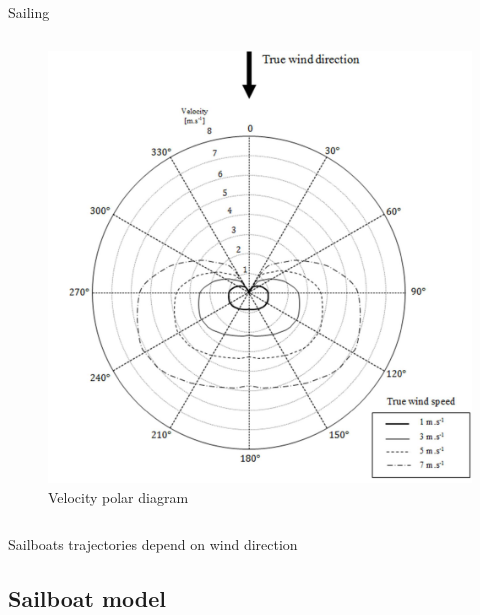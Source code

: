 \documentclass[10pt,xcolor={table,dvipsnames},t]{beamer}
\begin{document}
\begin{frame}{Sailing}
\begin{columns}
\begin{figure}
    \includegraphics[width=\linewidth]{documents/figures/alves_vpp.png}
    \caption{Velocity polar diagram \cite{Alves2010}}
    \label{fig:alves_velocity}
\end{figure}
\end{columns}
\centerline{Sailboats trajectories depend on wind direction}
\end{frame}

\subsection{Sailboat model}
\end{document}
